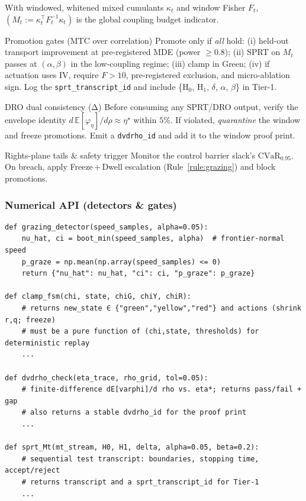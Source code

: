 \begin{definition}\label{def:coupling-mass}
With windowed, whitened mixed cumulants $\kappa_t$ and window Fisher $F_t$,
$(
M_t := \kappa_t^\top F_t^{-1}\kappa_t
)$
is the global coupling budget indicator.
\end{definition}

\begin{rulex}{Promotion gates (MTC over correlation)}\label{rule:promotion}
Promote only if \emph{all} hold: (i) held-out transport improvement at pre-registered MDE (power $\ge0.8$); (ii) SPRT on $M_t$ passes at $(\alpha,\beta)$ in the low-coupling regime; (iii) clamp in Green; (iv) if actuation uses IV, require $F>10$, pre-registered exclusion, and micro-ablation sign. Log the \texttt{sprt\_transcript\_id} and include \{H$_0$, H$_1$, $\delta$, $\alpha$, $\beta$\} in Tier-1. 
\end{rulex}

\begin{rulex}{DRO dual consistency (Δ)}\label{rule:dvdrho}
Before consuming any SPRT/DRO output, verify the envelope identity $d\,\mathbb E[\varphi_\eta]/d\rho\approx \eta^\star$ within $5\%$. If violated, \emph{quarantine} the window and freeze promotions. Emit a \texttt{dvdrho\_id} and add it to the window proof print.
\end{rulex}

\begin{rulex}{Rights-plane tails \& safety trigger}\label{rule:rights-cvar}
Monitor the control barrier slack’s $\mathrm{CVaR}_{0.95}$. On breach, apply Freeze\,+\,Dwell escalation (Rule~\ref{rule:grazing}) and block promotions.
\end{rulex}

\subsubsection*{Numerical API (detectors \& gates)}
\emph{}
\begin{lstlisting}
def grazing_detector(speed_samples, alpha=0.05):
    nu_hat, ci = boot_min(speed_samples, alpha)  # frontier-normal speed
    p_graze = np.mean(np.array(speed_samples) <= 0)
    return {"nu_hat": nu_hat, "ci": ci, "p_graze": p_graze}

def clamp_fsm(chi, state, chiG, chiY, chiR):
    # returns new_state ∈ {"green","yellow","red"} and actions (shrink r,q; freeze)
    # must be a pure function of (chi,state, thresholds) for deterministic replay
    ...

def dvdrho_check(eta_trace, rho_grid, tol=0.05):
    # finite-difference dE[varphi]/d rho vs. eta*; returns pass/fail + gap
    # also returns a stable dvdrho_id for the proof print
    ...

def sprt_Mt(mt_stream, H0, H1, delta, alpha=0.05, beta=0.2):
    # sequential test transcript: boundaries, stopping time, accept/reject
    # returns transcript and a sprt_transcript_id for Tier-1
    ...
\end{lstlisting}

